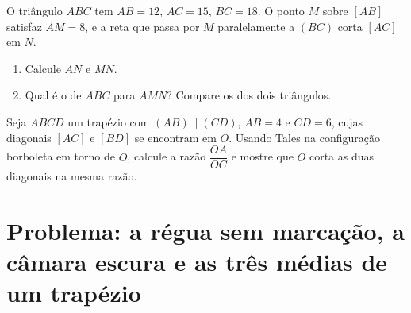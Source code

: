 \begin{exercise}[$\star\star$]\label{exo:g9:thales:8}
O triângulo $ABC$ tem $AB = 12$, $AC = 15$, $BC = 18$. O ponto $M$
sobre $[AB]$ satisfaz $AM = 8$, e a reta que passa por $M$
paralelamente a $(BC)$ corta $[AC]$ em $N$.
\begin{enumerate}
  \item Calcule $AN$ e $MN$.
  \item Qual é o  de $ABC$ para $AMN$? Compare os
         dos dois triângulos.
\end{enumerate}
\end{exercise}

\begin{exercise}[$\star\star\star$]\label{exo:g9:thales:9}
Seja $ABCD$ um trapézio com $(AB) \parallel (CD)$, $AB = 4$ e
$CD = 6$, cujas diagonais $[AC]$ e $[BD]$ se encontram em $O$. Usando
Tales na configuração borboleta em torno de $O$, calcule a razão
$\dfrac{OA}{OC}$ e mostre que $O$ corta as duas diagonais na mesma
razão.
\end{exercise}

\section{Problema: a régua sem marcação, a câmara escura e as três
médias de um trapézio}

